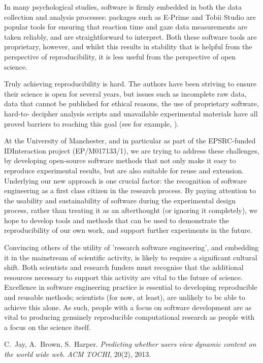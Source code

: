 \documentclass[a4paper,UKenglish]{dagrep}
\begin{document}
In many psychological studies, software is firmly embedded in both the data 
collection and analysis processes: packages such as E-Prime and Tobii Studio are
popular tools for ensuring that reaction time and gaze data measurements are
taken reliably, and are straightforward to interpret. Both these software tools
are proprietary, however, and whilst this results in stability that is helpful from
the perspective of reproducibility, it is less useful from the perspective of open
science.

Truly achieving reproducibility is hard. The authors have been striving to ensure 
their science is open for several years, but issues such as incomplete raw data, data 
that cannot be published for ethical reasons, the use of proprietary software, hard-to-
decipher analysis scripts and unavailable experimental materials have all proved 
barriers to reaching this goal (see for example, \cite{Jay2013TR}).

At the University of Manchester, and in particular as part of the EPSRC-funded 
IDInteraction project (EP/M017133/1), we are trying to address these challenges, by 
developing open-source software methods that not only make it easy to 
reproduce experimental results, but are also suitable for reuse and extension. 
Underlying our new approach is one crucial factor: the recognition of software 
engineering as a first class citizen in the research process. By paying attention to the 
usability and sustainability of software during the 
experimental design process, rather than treating it as an afterthought (or ignoring 
it completely), we hope to develop tools and methods that can be used to demonstrate 
the reproducibility of our own work, and support further experiments in the future.

Convincing others of the utility of 'research software engineering', and embedding it 
in the mainstream of scientific activity, is likely to require a significant cultural shift. 
Both scientists and research funders must recognise that the additional resources 
necessary to support this activity are vital to the future of science. Excellence in 
software engineering practice is essential to developing reproducible and reusable 
methods; scientists (for now, at least), are unlikely to be able to achieve this alone. As 
such, people with a focus on software development are as vital to producing genuinely 
reproducible computational research as people with a focus on the science itself. 

\begin{thebibliography}{0}
 C.~Jay, A.~Brown, S.~Harper.
\textsl{Predicting whether users view dynamic content on the world wide web}.
{\em ACM TOCHI}, 20(2), 2013.
\end{thebibliography}
 
\end{document}
